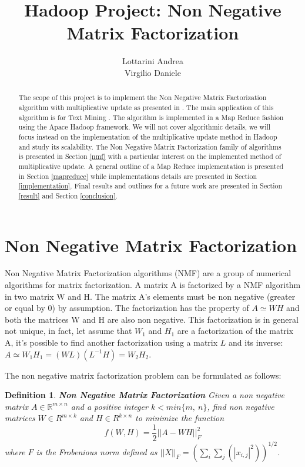 \documentclass[a4paper,12pt]{article}
\title{Hadoop Project: Non Negative Matrix Factorization}
\author{Lottarini Andrea \\ Virgilio Daniele}
\newtheorem{mydef}{Definition}[section]
\begin{document}
\maketitle

\begin{abstract}

The scope of this project is to implement the Non Negative Matrix Factorization algorithm with multiplicative update as presented in \citep{liu2010}.
The main application of this algorithm is for Text Mining \cite{05abstractemail}.
The algorithm is implemented in a Map Reduce fashion using the Apace Hadoop framework.
We will not cover algorithmic details, we will focus instead on the implementation of the multiplicative update method in Hadoop and study its scalability.
The Non Negative Matrix Factorization family of algorithms is presented in Section \ref{nmf} with a particular interest on the  implemented method of multiplicative update. 
A general outline of a Map Reduce implementation is presented in Section \ref{mapreduce} while implementations details are presented in Section \ref{implementation}.
Final results and outlines for a future work are presented in Section \ref{result} and Section \ref{conclusion}.

\end{abstract}

\section{Non Negative Matrix Factorization}
\label{nmf}

Non Negative Matrix Factorization algorithms (NMF) are a group of numerical algorithms for matrix factorization.
A matrix A is factorized by a NMF algorithm in two matrix W and H. 
The matrix A's elements must be non negative (greater or equal by 0) by assumption. 
The factorization has the property of $ A \simeq W H $ and both the matrices W and H are also non negative. 
This factorization is in general not unique, in fact, let assume that $W_1$ and $H_1$ are a factorization of the matrix A, it's possible to find another factorization using a matrix $L$ and its inverse: $A \simeq W_1 H_1 = ( W L ) (L^{-1} H) = W_2 H_2  $. 

The non negative matrix factorization problem can be formulated as follows:
\begin{mydef} \textbf{Non Negative Matrix Factorization}
  Given a non negative matrix $A \in \mathbb{R}^{m×n}$ and a positive integer $k<min\{m,~n\} $, find non 	
  	negative matrices $W \in R^{m×k}$ and $H \in R^{k×n}$ to minimize the function  
  	$$ f ( W , H ) = \frac{1}{2} || A − W H ||_F^2$$ where $F$ is the Frobenious norm defined as
  	$|| X ||_F = ( \sum_i \sum_j( |x_{i,j}|^2 ) )^{1/2}$. 
  	\label{def:nmf}
\end{mydef}
\end{document}
